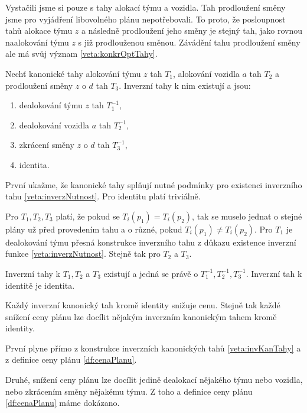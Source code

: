 Vystačili jsme si pouze s tahy alokací týmu a vozidla.
Tah prodloužení směny jsme pro vyjádření libovolného plánu nepotřebovali.
To proto, že posloupnost tahů alokace týmu $z$ a následně prodloužení jeho směny je stejný tah, jako rovnou naalokování týmu $z$ s již prodlouženou směnou.
Závádění tahu prodloužení směny ale má svůj význam \ref{veta:konkrOptTahy}.

\begin{veta}\label{veta:invKanTahy}
  Nechť kanonické tahy alokování týmu $z$ tah $T_1$, alokování vozidla $a$ tah $T_2$ a prodloužení směny $z$ o $d$ tah $T_3$.
  Inverzní tahy k nim existují a jsou:

  \begin{enumerate}
    \item
      dealokování týmu $z$ tah $T_1^{-1}$,

    \item
      dealokování vozidla $a$ tah $T_2^{-1}$,

    \item
      zkrácení směny $z$ o $d$ tah $T_3^{-1}$,

    \item
      identita.
  \end{enumerate}
\end{veta}
\begin{dukaz}
  První ukažme, že kanonické tahy splňují nutné podmínky pro existenci inverzního tahu \ref{veta:inverzNutnost}.
  Pro identitu platí triviálně.

  Pro $T_1, T_2, T_3$ platí, že pokud se $T_i(p_1) = T_i(p_2)$, tak se muselo jednat o stejné plány už před provedením tahu a o různé, pokud $T_i(p_1) \neq T_i(p_2)$.
  Pro $T_1$ je dealokování týmu přesná konstrukce inverzního tahu z důkazu existence inverzní funkce \ref{veta:inverzNutnost}.
  Stejně tak pro $T_2$ a $T_3$.

  Inverzní tahy k $T_1, T_2$ a $T_3$ existují a jedná se právě o $T_1^{-1}, T_2^{-1}, T_3^{-1}$.
  Inverzní tah k identitě je identita.
\end{dukaz}

\begin{veta}\label{veta:kazdyInvSnizujeCenu}
  Každý inverzní kanonický tah kromě identity snižuje cenu.
  Stejně tak každé snížení ceny plánu lze docílit nějakým inverzním kanonickým tahem kromě identity.
\end{veta}
\begin{dukaz}
  První plyne přímo z konstrukce inverzních kanonických tahů \ref{veta:invKanTahy} a z definice ceny plánu \ref{df:cenaPlanu}.

  Druhé, snížení ceny plánu lze docílit jedině dealokací nějakého týmu nebo vozidla, nebo zkrácením směny nějakému týmu.
  Z toho a definice ceny plánu \ref{df:cenaPlanu} máme dokázano.
\end{dukaz}

